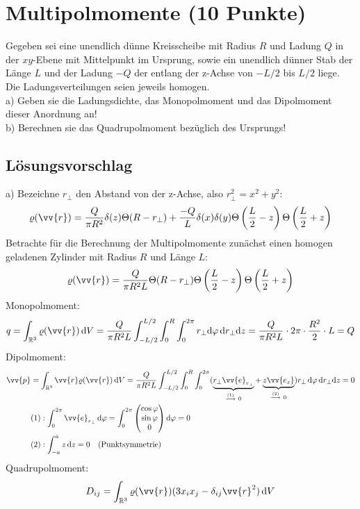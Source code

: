 \documentclass[a4paper,12pt]{article}
\begin{document}
\section{Multipolmomente (10 Punkte)}
Gegeben sei eine unendlich dünne Kreisscheibe mit Radius $R$ und Ladung $Q$ in der $xy$-Ebene mit Mittelpunkt im Ursprung, sowie ein unendlich dünner Stab der Länge $L$ und der Ladung $-Q$ der entlang der z-Achse von $-L/2$ bis $L/2$ liege. Die Ladungsverteilungen seien jeweils homogen.\\
a) Geben sie die Ladungsdichte, das Monopolmoment und das Dipolmoment dieser Anordnung an!\\
b) Berechnen sie das Quadrupolmoment bezüglich des Ursprungs!
\subsection*{Lösungsvorschlag}
a) Bezeichne $r_\bot$ den Abstand von der z-Achse, also $r_\bot^2=x^2+y^2$:
 $$\varrho(\vv{r})=\frac{Q}{\pi R^2}\delta(z)\Theta(R-r_\bot)+\frac{-Q}{L}\delta(x)\delta(y)\Theta\left(\frac{L}{2}-z\right)\Theta\left(\frac{L}{2}+z\right)$$
 Betrachte für die Berechnung der Multipolmomente zunächst einen homogen geladenen Zylinder mit Radius $R$ und Länge $L$:
 $$\varrho(\vv{r})=\frac{Q}{\pi R^2L}\Theta(R-r_\bot)\Theta\left(\frac{L}{2}-z\right)\Theta\left(\frac{L}{2}+z\right)$$
 Monopolmoment:
$$ q=\int_{\mathbb{R}^3}\varrho(\vv{r})\,\textrm{d}V=\frac{Q}{\pi R^2L}\int_{-L/2}^{L/2}\int_0^{R}\int_0^{2\pi}r_\bot\textrm{d}\varphi\,\textrm{d}r_\bot\textrm{d}z=\frac{Q}{\pi R^2L}\cdot 2\pi\cdot\frac{R^2}{2}\cdot L=Q $$
Dipolmoment:
\begin{align*}\vv{p}&=\int_{\mathbb{R}^3}\vv{r}\varrho(\vv{r})\,\textrm{d}V=\frac{Q}{\pi R^2L}\int_{-L/2}^{L/2}\int_0^{R}\int_0^{2\pi}(\underbrace{r_\bot\vv{e}_{r_\bot}}_{\overset{(1)}{\longrightarrow}\ 0}+\underbrace{z\vv{e_z}}_{\overset{(2)}{\longrightarrow}\ 0})r_\bot\,\textrm{d}\varphi\,\textrm{d}r_\bot\textrm{d}z=0\\
&(1):\int_0^{2\pi}\vv{e}_{r_\bot}\,\textrm{d}\varphi=\int_0^{2\pi}\begin{pmatrix}
\cos\varphi\\ \sin\varphi\\ 0
\end{pmatrix}\textrm{d}\varphi=0\\
&(2):\int_{-a}^{a}z\,\textrm{d}z=0 \ \ \ (\textrm{Punktsymmetrie})
\end{align*}
Quadrupolmoment:
$$D_{ij}=\int_{\mathbb{R}^3}\varrho(\vv{r})(3x_ix_j-\delta_{ij}\vv{r}^2)\,\textrm{d}V$$
\end{document}
